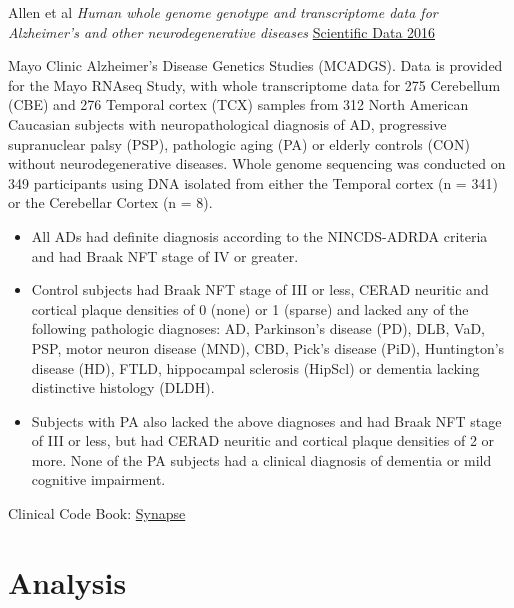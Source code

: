\documentclass[]{book}
\newenvironment{Shaded}{\begin{snugshade}}{\end{snugshade}}
\newcommand{\DataTypeTok}[1]{\textcolor[rgb]{0.13,0.29,0.53}{#1}}
\newcommand{\KeywordTok}[1]{\textcolor[rgb]{0.13,0.29,0.53}{\textbf{#1}}}
\newcommand{\NormalTok}[1]{#1}
\newcommand{\OperatorTok}[1]{\textcolor[rgb]{0.81,0.36,0.00}{\textbf{#1}}}
\newcommand{\StringTok}[1]{\textcolor[rgb]{0.31,0.60,0.02}{#1}}
\providecommand{\tightlist}{%
  \setlength{\itemsep}{0pt}\setlength{\parskip}{0pt}}
\begin{document}
Allen et al \emph{Human whole genome genotype and transcriptome data for Alzheimer's and other neurodegenerative diseases} \href{https://www.nature.com/articles/sdata201689}{Scientific Data 2016}

Mayo Clinic Alzheimer's Disease Genetics Studies (MCADGS). Data is provided for the Mayo RNAseq Study, with whole transcriptome data for 275 Cerebellum (CBE) and 276 Temporal cortex (TCX) samples from 312 North American Caucasian subjects with neuropathological diagnosis of AD, progressive supranuclear palsy (PSP), pathologic aging (PA) or elderly controls (CON) without neurodegenerative diseases. Whole genome sequencing was conducted on 349 participants using DNA isolated from either the Temporal cortex (n = 341) or the Cerebellar Cortex (n = 8).

\begin{itemize}
\tightlist
\item
  All ADs had definite diagnosis according to the NINCDS-ADRDA criteria and had Braak NFT stage of IV or greater.
\item
  Control subjects had Braak NFT stage of III or less, CERAD neuritic and cortical plaque densities of 0 (none) or 1 (sparse) and lacked any of the following pathologic diagnoses: AD, Parkinson's disease (PD), DLB, VaD, PSP, motor neuron disease (MND), CBD, Pick's disease (PiD), Huntington's disease (HD), FTLD, hippocampal sclerosis (HipScl) or dementia lacking distinctive histology (DLDH).
\item
  Subjects with PA also lacked the above diagnoses and had Braak NFT stage of III or less, but had CERAD neuritic and cortical plaque densities of 2 or more. None of the PA subjects had a clinical diagnosis of dementia or mild cognitive impairment.
\end{itemize}

Clinical Code Book: \href{https://adknowledgeportal.synapse.org/Explore/Studies?Study=syn5550404}{Synapse}

\hypertarget{analysis}{%
\chapter{Analysis}\label{analysis}}

\begin{Shaded}
\end{Shaded}
\end{document}
